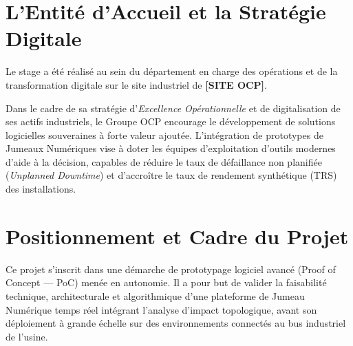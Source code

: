 \section{L'Entité d'Accueil et la Stratégie Digitale}

Le stage a été réalisé au sein du département en charge des opérations et de la transformation digitale sur le site industriel de \textbf{[SITE OCP]}. 

Dans le cadre de sa stratégie d'\textit{Excellence Opérationnelle} et de digitalisation de ses actifs industriels, le Groupe OCP encourage le développement de solutions logicielles souveraines à forte valeur ajoutée. L'intégration de prototypes de Jumeaux Numériques vise à doter les équipes d'exploitation d'outils modernes d'aide à la décision, capables de réduire le taux de défaillance non planifiée (\textit{Unplanned Downtime}) et d'accroître le taux de rendement synthétique (TRS) des installations.

\section{Positionnement et Cadre du Projet}

Ce projet s'inscrit dans une démarche de prototypage logiciel avancé (Proof of Concept --- PoC) menée en autonomie. Il a pour but de valider la faisabilité technique, architecturale et algorithmique d'une plateforme de Jumeau Numérique temps réel intégrant l'analyse d'impact topologique, avant son déploiement à grande échelle sur des environnements connectés au bus industriel de l'usine.
